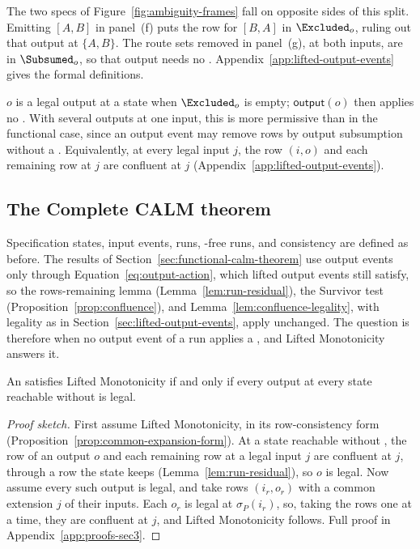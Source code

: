 The two specs of Figure~\ref{fig:ambiguity-frames} fall on opposite sides of this split.  Emitting $[A,B]$ in panel~(f) puts the row for $[B,A]$ in $\Excluded_o$, ruling out that output at $\{A,B\}$.  The route sets removed in panel~(g), at both inputs, are in $\Subsumed_o$, so that output needs no \commitment.
Appendix~\ref{app:lifted-output-events} gives the formal definitions.

$o$ is a legal output at a state when $\Excluded_o$ is empty;
$\mathsf{output}(o)$ then applies no \commitment.  With several
outputs at one input, this is more permissive than in the functional case,
since an output event may remove rows by output subsumption without a
\commitment.  Equivalently, at every legal input $j$, the row $(i,o)$ and each remaining row at $j$ are confluent at $j$ (Appendix~\ref{app:lifted-output-events}).

\subsection{The Complete CALM theorem}
\label{sec:complete-calm-theorem}

Specification states, input events, runs, \commitment-free runs, and
consistency are defined as before.  The results of Section~\ref{sec:functional-calm-theorem}
use output events only through Equation~\ref{eq:output-action}, which lifted
output events still satisfy, so the rows-remaining lemma
(Lemma~\ref{lem:run-residual}), the Survivor test
(Proposition~\ref{prop:confluence}), and
Lemma~\ref{lem:confluence-legality}, with legality as in
Section~\ref{sec:lifted-output-events}, apply unchanged.  The question is
therefore when no output event of a run applies a \commitment, and Lifted
Monotonicity answers it.

\begin{proposition}
\label{prop:exposure-boundary}
An \spectype satisfies Lifted Monotonicity if and only
if every output at every state reachable without \commitment is legal.
\end{proposition}

\begin{proof}[Proof sketch]
First assume Lifted Monotonicity, in its row-consistency form
(Proposition~\ref{prop:common-expansion-form}).  At a state reachable without
\commitment, the row of an output $o$ and each remaining row at a legal input $j$ are confluent at $j$, through a row the state keeps
(Lemma~\ref{lem:run-residual}), so $o$ is legal.  Now assume every such output
is legal, and take rows $(i_r,o_r)$ with a common extension $j$ of their inputs.  Each $o_r$ is legal at $\sigma_P(i_r)$, so, taking the rows one at a time, they are confluent at $j$, and Lifted Monotonicity follows.  Full proof in
Appendix~\ref{app:proofs-sec3}.
\end{proof}

